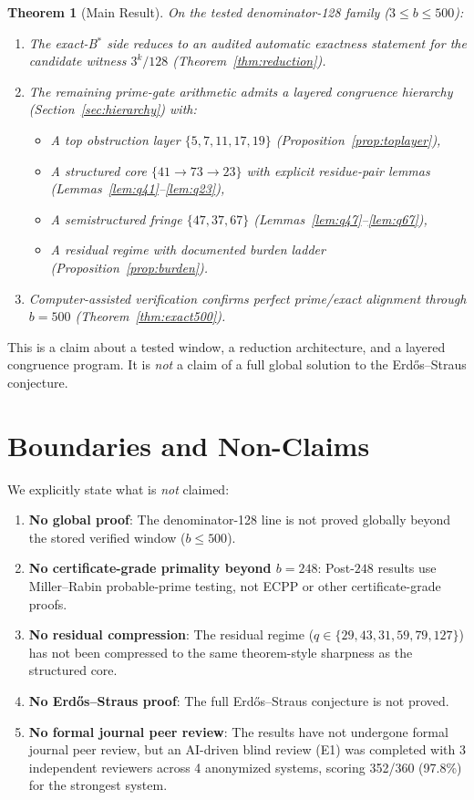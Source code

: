 \documentclass[11pt,letterpaper]{article}
\newtheorem{theorem}{Theorem}
\begin{document}
\begin{theorem}[Main Result]\label{thm:main}
On the tested denominator-128 family ($3 \leq b \leq 500$):
\begin{enumerate}
    \item The exact-B$^\ast$ side reduces to an audited automatic exactness statement for the candidate witness $3^k/128$ (Theorem~\ref{thm:reduction}).
    \item The remaining prime-gate arithmetic admits a layered congruence hierarchy (Section~\ref{sec:hierarchy}) with:
    \begin{itemize}
        \item A top obstruction layer $\{5, 7, 11, 17, 19\}$ (Proposition~\ref{prop:toplayer}),
        \item A structured core $\{41 \to 73 \to 23\}$ with explicit residue-pair lemmas (Lemmas~\ref{lem:q41}--\ref{lem:q23}),
        \item A semistructured fringe $\{47, 37, 67\}$ (Lemmas~\ref{lem:q47}--\ref{lem:q67}),
        \item A residual regime with documented burden ladder (Proposition~\ref{prop:burden}).
    \end{itemize}
    \item Computer-assisted verification confirms perfect prime/exact alignment through $b = 500$ (Theorem~\ref{thm:exact500}).
\end{enumerate}
\end{theorem}

This is a claim about a tested window, a reduction architecture, and a layered congruence program.
It is \emph{not} a claim of a full global solution to the Erd\H{o}s--Straus conjecture.

\section{Boundaries and Non-Claims}

We explicitly state what is \emph{not} claimed:
\begin{enumerate}
    \item \textbf{No global proof}: The denominator-128 line is not proved globally beyond the stored verified window ($b \leq 500$).
    \item \textbf{No certificate-grade primality beyond $b = 248$}: Post-$248$ results use Miller--Rabin probable-prime testing, not ECPP or other certificate-grade proofs.
    \item \textbf{No residual compression}: The residual regime ($q \in \{29, 43, 31, 59, 79, 127\}$) has not been compressed to the same theorem-style sharpness as the structured core.
    \item \textbf{No Erd\H{o}s--Straus proof}: The full Erd\H{o}s--Straus conjecture is not proved.
    \item \textbf{No formal journal peer review}: The results have not undergone formal journal peer review, but an AI-driven blind review (E1) was completed with 3 independent reviewers across 4 anonymized systems, scoring 352/360 (97.8\%) for the strongest system.
\end{enumerate}
\end{document}

